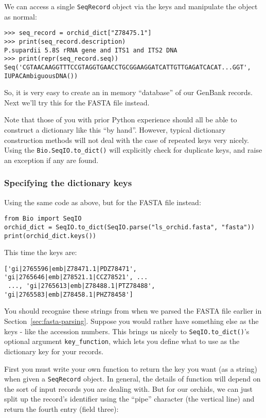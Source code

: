 We can access a single \verb|SeqRecord| object via the keys and manipulate the object as normal:

\begin{verbatim}
>>> seq_record = orchid_dict["Z78475.1"]
>>> print(seq_record.description)
P.supardii 5.8S rRNA gene and ITS1 and ITS2 DNA
>>> print(repr(seq_record.seq))
Seq('CGTAACAAGGTTTCCGTAGGTGAACCTGCGGAAGGATCATTGTTGAGATCACAT...GGT', IUPACAmbiguousDNA())
\end{verbatim}

So, it is very easy to create an in memory ``database'' of our GenBank records.  Next we'll try this for the FASTA file instead.

Note that those of you with prior Python experience should all be able to construct a dictionary like this ``by hand''.  However, typical dictionary construction methods will not deal with the case of repeated keys very nicely.  Using the \verb|Bio.SeqIO.to_dict()| will explicitly check for duplicate keys, and raise an exception if any are found.

\subsubsection{Specifying the dictionary keys}
\label{seq:seqio-todict-functionkey}

Using the same code as above, but for the FASTA file instead:

\begin{verbatim}
from Bio import SeqIO
orchid_dict = SeqIO.to_dict(SeqIO.parse("ls_orchid.fasta", "fasta"))
print(orchid_dict.keys())
\end{verbatim}

\noindent This time the keys are:

\begin{verbatim}
['gi|2765596|emb|Z78471.1|PDZ78471', 'gi|2765646|emb|Z78521.1|CCZ78521', ...
 ..., 'gi|2765613|emb|Z78488.1|PTZ78488', 'gi|2765583|emb|Z78458.1|PHZ78458']
\end{verbatim}

You should recognise these strings from when we parsed the FASTA file earlier in Section~\ref{sec:fasta-parsing}.  Suppose you would rather have something else as the keys - like the accession numbers.  This brings us nicely to \verb|SeqIO.to_dict()|'s optional argument \verb|key_function|, which lets you define what to use as the dictionary key for your records.

First you must write your own function to return the key you want (as a string) when given a \verb|SeqRecord| object.  In general, the details of function will depend on the sort of input records you are dealing with.  But for our orchids, we can just split up the record's identifier using the ``pipe'' character (the vertical line) and return the fourth entry (field three):

